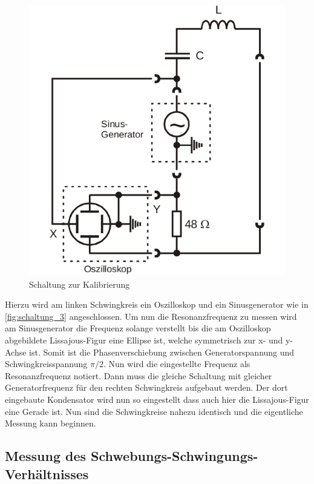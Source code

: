 \begin{figure}
    \centering
    \includegraphics[width=\textwidth/3]{images/schaltung_3.png}
    \caption{Schaltung zur Kalibrierung\cite{V355}}
    \label{fig:schaltung_3}
\end{figure}
Hierzu wird am linken Schwingkreis ein Oszilloskop und ein Sinusgenerator wie in \autoref{fig:schaltung_3} angeschlossen. 
Um nun die Resonanzfrequenz zu messen wird am Sinusgenerator die Frequenz solange verstellt bis die am Oszilloskop abgebildete Lissajous-Figur eine Ellipse ist, welche symmetrisch zur x- und y-Achse ist. Somit ist die Phasenverschiebung zwischen Generatorspannung und Schwingkreisspannung $\pi/2$. 
Nun wird die eingestellte Frequenz als Resonanzfrequenz notiert.
Dann muss die gleiche Schaltung mit gleicher Generatorfrequenz für den rechten Schwingkreis aufgebaut werden.
Der dort eingebaute Kondensator wird nun so eingestellt dass auch hier die Lissajous-Figur eine Gerade ist. Nun sind die Schwingkreise nahezu identisch und die eigentliche Messung kann beginnen.

\subsection{Messung des Schwebungs-Schwingungs-Verhältnisses}
\label{sec:schwebung}


